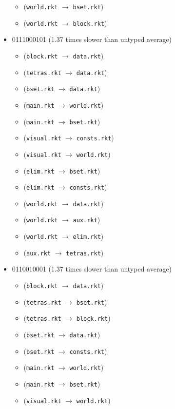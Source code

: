\documentclass{article}
\newcommand{\mono}[1]{\texttt{#1}}
\begin{document}
\begin{itemize}
\begin{itemize}
  \item (\mono{world.rkt} $\rightarrow$ \mono{bset.rkt})
  \item (\mono{world.rkt} $\rightarrow$ \mono{block.rkt})
  \end{itemize}
\item 0111000101 (1.37 times slower than untyped average)
  \begin{itemize}
  \item (\mono{block.rkt} $\rightarrow$ \mono{data.rkt})
  \item (\mono{tetras.rkt} $\rightarrow$ \mono{data.rkt})
  \item (\mono{bset.rkt} $\rightarrow$ \mono{data.rkt})
  \item (\mono{main.rkt} $\rightarrow$ \mono{world.rkt})
  \item (\mono{main.rkt} $\rightarrow$ \mono{bset.rkt})
  \item (\mono{visual.rkt} $\rightarrow$ \mono{consts.rkt})
  \item (\mono{visual.rkt} $\rightarrow$ \mono{world.rkt})
  \item (\mono{elim.rkt} $\rightarrow$ \mono{bset.rkt})
  \item (\mono{elim.rkt} $\rightarrow$ \mono{consts.rkt})
  \item (\mono{world.rkt} $\rightarrow$ \mono{data.rkt})
  \item (\mono{world.rkt} $\rightarrow$ \mono{aux.rkt})
  \item (\mono{world.rkt} $\rightarrow$ \mono{elim.rkt})
  \item (\mono{aux.rkt} $\rightarrow$ \mono{tetras.rkt})
  \end{itemize}
\item 0110010001 (1.37 times slower than untyped average)
  \begin{itemize}
  \item (\mono{block.rkt} $\rightarrow$ \mono{data.rkt})
  \item (\mono{tetras.rkt} $\rightarrow$ \mono{bset.rkt})
  \item (\mono{tetras.rkt} $\rightarrow$ \mono{block.rkt})
  \item (\mono{bset.rkt} $\rightarrow$ \mono{data.rkt})
  \item (\mono{bset.rkt} $\rightarrow$ \mono{consts.rkt})
  \item (\mono{main.rkt} $\rightarrow$ \mono{world.rkt})
  \item (\mono{main.rkt} $\rightarrow$ \mono{bset.rkt})
  \item (\mono{visual.rkt} $\rightarrow$ \mono{world.rkt})

\end{itemize}
\end{itemize}
\end{document}
